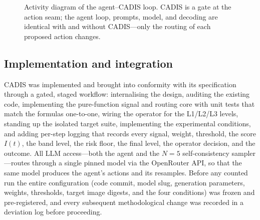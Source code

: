\documentclass[11pt]{article}
\begin{document}
\begin{figure}[t]
\centering
{}
\caption{Activity diagram of the agent--CADIS loop. CADIS is a gate at the action seam; the agent loop,
prompts, model, and decoding are identical with and without CADIS---only the routing of each proposed
action changes.}
\label{fig:activity}
\end{figure}

\subsection{Implementation and integration}
CADIS was implemented and brought into conformity with its specification through a gated, staged
workflow: internalising the design, auditing the existing code, implementing the pure-function signal
and routing core with unit tests that match the formulas one-to-one, wiring the operator for the L1/L2/L3
levels, standing up the isolated target suite, implementing the experimental conditions, and adding
per-step logging that records every signal, weight, threshold, the score $I(t)$, the band level, the risk
floor, the final level, the operator decision, and the outcome. All LLM access---both the agent and the
$N{=}5$ self-consistency sampler---routes through a single pinned model via the OpenRouter API, so that
the same model produces the agent's actions and its resamples. Before any counted run the entire
configuration (code commit, model slug, generation parameters, weights, thresholds, target image
digests, and the four conditions) was frozen and pre-registered, and every subsequent methodological
change was recorded in a deviation log before proceeding.
\end{document}
